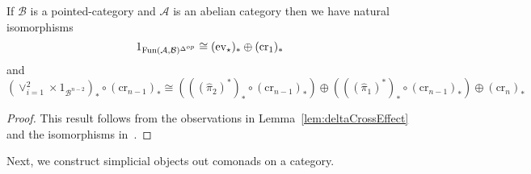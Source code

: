 \begin{cor}[label=cor:DeltaIndDefn]
    If $\mathcal{B}$ is a pointed-category and $\mathcal{A}$ is an abelian category then we have natural isomorphisms 
    \begin{equation*}
        1_{\text{Fun}(\mathcal{A},\mathcal{B})^{\Delta^{op}}} \cong (\text{ev}_\star)_*\oplus (\text{cr}_1)_*
    \end{equation*}
    and
    \begin{equation*}
        (\lor_{i=1}^2\times 1_{\mathcal{B}^{n-2}})_*\circ (\text{cr}_{n-1})_* \cong (((\hat{\pi}_2)^*)_*\circ (\text{cr}_{n-1})_*)\oplus (((\hat{\pi}_1)^*)_*\circ (\text{cr}_{n-1})_*) \oplus (\text{cr}_n)_*
    \end{equation*}
\end{cor}
\begin{proof}
    This result follows from the observations in Lemma~\ref{lem:deltaCrossEffect} and the isomorphisms in~\cite{lem:implNatIso}.
\end{proof}

Next, we construct simplicial objects out comonads on a category.


